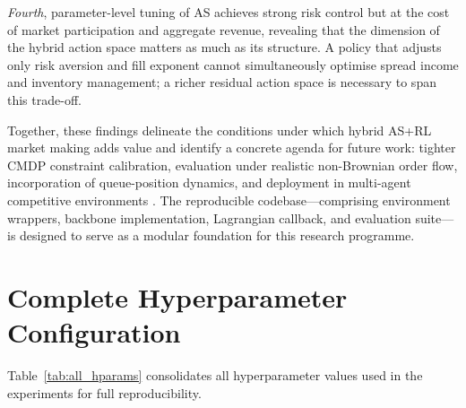 \documentclass[11pt]{article}
\begin{document}
\textit{Fourth}, parameter-level tuning of AS achieves strong risk
control but at the cost of market participation and aggregate revenue,
revealing that the dimension of the hybrid action space matters as much
as its structure.
A policy that adjusts only risk aversion and fill exponent cannot
simultaneously optimise spread income and inventory management; a richer
residual action space is necessary to span this trade-off.

Together, these findings delineate the conditions under which hybrid
AS+RL market making adds value and identify a concrete agenda for
future work: tighter CMDP constraint calibration, evaluation under
realistic non-Brownian order flow, incorporation of queue-position
dynamics, and deployment in multi-agent competitive environments
\parencite{menkveld2013high,byrd2019abides}.
The reproducible codebase---comprising environment wrappers, backbone
implementation, Lagrangian callback, and evaluation suite---is designed
to serve as a modular foundation for this research programme.

\appendix

\section{Complete Hyperparameter Configuration}
\label{app:hparams}

Table~\ref{tab:all_hparams} consolidates all hyperparameter values used
in the experiments for full reproducibility.
\end{document}
